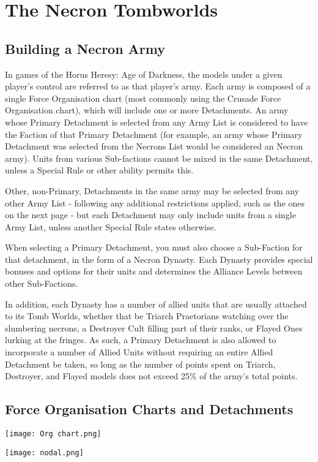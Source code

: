 \section{The Necron Tombworlds}


\subsection{Building a Necron Army}

In games of the Horus Heresy: Age of Darkness, the models under a given player’s control are referred to as that player’s army. Each army is composed of a single Force Organisation chart (most commonly using the Crusade Force Organisation chart), which will include one or more Detachments. An army whose Primary Detachment is selected from any Army List is considered to have the Faction of that Primary Detachment (for example, an army whose Primary Detachment was selected from the Necrons List would be considered an Necron army). Units from various Sub-factions cannot be mixed in the same Detachment, unless a Special Rule or other ability permits this.

Other, non-Primary, Detachments in the same army may be selected from any other Army List - following any additional restrictions applied, such as the ones on the next page - but each Detachment may only include units from a single Army List, unless another Special Rule states otherwise.

When selecting a Primary Detachment, you must also choose a Sub-Faction for that detachment, in the form of a Necron Dynasty. Each Dynasty provides special bonuses and options for their units and determines the Alliance Levels between other Sub-Factions.

In addition, each Dynasty has a number of allied units that are usually attached to its Tomb Worlds, whether that be Triarch Praetorians watching over the slumbering necrons, a Destroyer Cult filling part of their ranks, or Flayed Ones lurking at the fringes. As such, a Primary Detachment is also allowed to incorporate a number of Allied Units without requiring an entire Allied Detachment be taken, so long as the number of points spent on Triarch, Destroyer, and Flayed models does not exceed 25\% of the army's total points.

\newpage
\subsection{Force Organisation Charts and Detachments}

\newpage
\texttt{[image: Org chart.png]}

\newpage
\texttt{[image: nodal.png]}